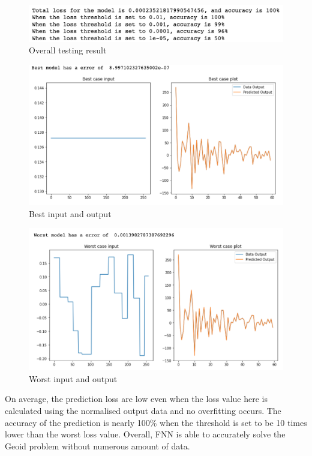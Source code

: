 \begin{figure}[H]
    \caption{Overall testing result}
    \includegraphics[scale=0.8]{Report LaTeX/figures/geoid_images/Geoid_OverallTesting.png}
\end{figure}

\begin{figure}[H]
    \caption{Best input and output}
    \includegraphics[scale=0.6]{Report LaTeX/figures/geoid_images/Geoid_Best.png}
\end{figure}

\begin{figure}[H]
    \caption{Worst input and output}
    \includegraphics[scale=0.6]{Report LaTeX/figures/geoid_images/Geoid_Worst.png}
\end{figure}

On average, the prediction loss are low even when the loss value here is calculated using the normalised output data and no overfitting occurs. The accuracy of the prediction is nearly 100\% when the threshold is set to be 10 times lower than the worst loss value. Overall, FNN is able to accurately solve the Geoid problem without numerous amount of data.


